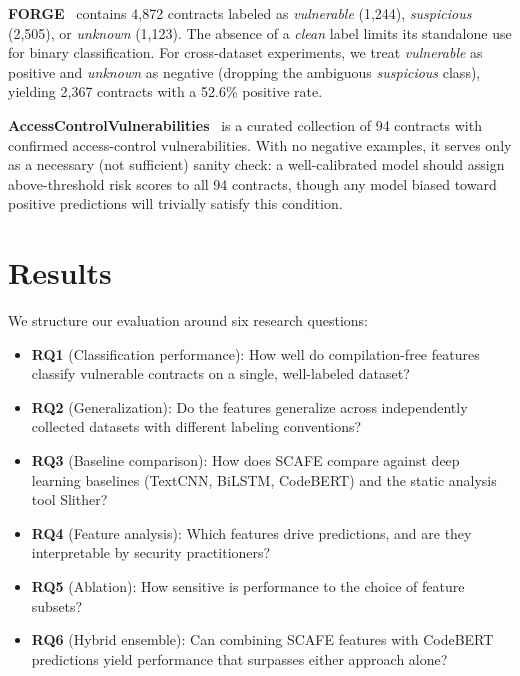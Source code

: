 \documentclass[11pt,a4paper]{article}
\newcommand{\MethodName}{SCAFE\xspace}
\begin{document}
\textbf{FORGE}~\cite{chen2025forge} contains 4,872 contracts labeled as \emph{vulnerable} (1,244), \emph{suspicious} (2,505), or \emph{unknown} (1,123).
The absence of a \emph{clean} label limits its standalone use for binary classification.
For cross-dataset experiments, we treat \emph{vulnerable} as positive and \emph{unknown} as negative (dropping the ambiguous \emph{suspicious} class), yielding 2,367 contracts with a 52.6\% positive rate.

\textbf{AccessControlVulnerabilities}~\cite{liu2025acbenchmark} is a curated collection of 94 contracts with confirmed access-control vulnerabilities.
With no negative examples, it serves only as a necessary (not sufficient) sanity check: a well-calibrated model should assign above-threshold risk scores to all 94 contracts, though any model biased toward positive predictions will trivially satisfy this condition.

\section{Results}
\label{sec:results}

We structure our evaluation around six research questions:

\begin{itemize}
    \item \textbf{RQ1} (Classification performance): How well do compilation-free features classify vulnerable contracts on a single, well-labeled dataset?
    \item \textbf{RQ2} (Generalization): Do the features generalize across independently collected datasets with different labeling conventions?
    \item \textbf{RQ3} (Baseline comparison): How does \MethodName compare against deep learning baselines (TextCNN, BiLSTM, CodeBERT) and the static analysis tool Slither?
    \item \textbf{RQ4} (Feature analysis): Which features drive predictions, and are they interpretable by security practitioners?
    \item \textbf{RQ5} (Ablation): How sensitive is performance to the choice of feature subsets?
    \item \textbf{RQ6} (Hybrid ensemble): Can combining \MethodName features with CodeBERT predictions yield performance that surpasses either approach alone?
\end{itemize}
\end{document}
